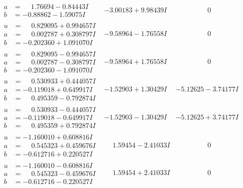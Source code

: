 \documentclass[1p]{elsarticle_modified}
\theoremstyle{definition}
\begin{document}
$$\begin{array}{c|c|c}
\begin{aligned}
a &= \phantom{-}1.76694 - 0.84443 I \\
b &= -0.88862 - 1.59075 I\end{aligned}
 & -3.00183 + 9.98439 I & \phantom{-0.000000 } 0 \\ \hline\begin{aligned}
u &= \phantom{-}0.829095 + 0.994657 I \\
a &= \phantom{-}0.002787 + 0.308797 I \\
b &= -0.202360 + 1.091070 I\end{aligned}
 & -9.58964 - 1.76558 I & \phantom{-0.000000 } 0 \\ \hline\begin{aligned}
u &= \phantom{-}0.829095 - 0.994657 I \\
a &= \phantom{-}0.002787 - 0.308797 I \\
b &= -0.202360 - 1.091070 I\end{aligned}
 & -9.58964 + 1.76558 I & \phantom{-0.000000 } 0 \\ \hline\begin{aligned}
u &= \phantom{-}0.530933 + 0.444057 I \\
a &= -0.119018 + 0.649917 I \\
b &= \phantom{-}0.495359 - 0.792874 I\end{aligned}
 & -1.52903 + 1.30429 I & -5.12625 - 3.74177 I \\ \hline\begin{aligned}
u &= \phantom{-}0.530933 - 0.444057 I \\
a &= -0.119018 - 0.649917 I \\
b &= \phantom{-}0.495359 + 0.792874 I\end{aligned}
 & -1.52903 - 1.30429 I & -5.12625 + 3.74177 I \\ \hline\begin{aligned}
u &= -1.160010 + 0.608816 I \\
a &= \phantom{-}0.545323 + 0.459676 I \\
b &= -0.612716 + 0.220527 I\end{aligned}
 & \phantom{-}1.59454 - 2.41033 I & \phantom{-0.000000 } 0 \\ \hline\begin{aligned}
u &= -1.160010 - 0.608816 I \\
a &= \phantom{-}0.545323 - 0.459676 I \\
b &= -0.612716 - 0.220527 I\end{aligned}
 & \phantom{-}1.59454 + 2.41033 I & \phantom{-0.000000 } 0\\

\end{array}$$
\end{document}
